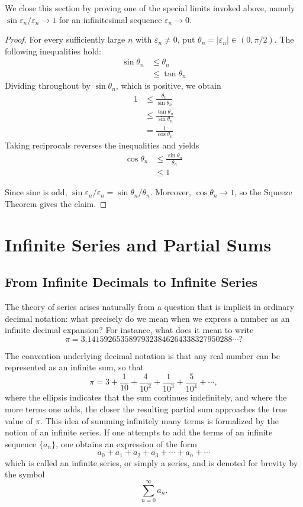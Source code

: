 We close this section by proving one of the special limits invoked above, namely $\sin \varepsilon_n / \varepsilon_n \to 1$
for an infinitesimal sequence $\varepsilon_n \to 0$.

\begin{proof}
For every sufficiently large $n$ with $\varepsilon_n\neq0$, put
$\theta_n=|\varepsilon_n|\in(0,\pi/2)$. The following inequalities hold:
\[
\begin{aligned}
\sin \theta_n &\leq \theta_n \\
&\leq \tan \theta_n
\end{aligned}
\]
Dividing throughout by $\sin \theta_n$, which is positive, we obtain
\[
\begin{aligned}
1 &\leq \frac{\theta_n}{\sin \theta_n} \\
&\leq \frac{\tan \theta_n}{\sin \theta_n} \\
&= \frac{1}{\cos \theta_n}
\end{aligned}
\]
Taking reciprocals reverses the inequalities and yields
\[
\begin{aligned}
\cos \theta_n &\leq \frac{\sin \theta_n}{\theta_n} \\
&\leq 1
\end{aligned}
\]

Since sine is odd,
$\sin\varepsilon_n/\varepsilon_n=\sin\theta_n/\theta_n$. Moreover,
$\cos\theta_n\to1$, so the Squeeze Theorem gives the claim.
\end{proof}

\section{Infinite Series and Partial Sums}

\subsection{From Infinite Decimals to Infinite Series}

The theory of series arises naturally from a question that is implicit in ordinary decimal notation: what
precisely do we mean when we express a number as an infinite decimal expansion? For instance, what does it mean
to write
\[
\pi = 3.14159265358979323846264338327950288 \cdots?
\]

The convention underlying decimal notation is that any real number can be represented as an infinite sum, so
that
\[
\pi = 3 + \frac{1}{10} + \frac{4}{10^2} + \frac{1}{10^3} + \frac{5}{10^4} + \cdots,
\] where the ellipsis indicates that the sum continues indefinitely, and where the more terms one adds, the closer
the resulting partial sum approaches the true value of $\pi$. This idea of summing infinitely many terms is
formalized by the notion of an infinite series. If one attempts to add the terms of an infinite sequence
$\{a_n\}$, one obtains an expression of the form
\[
a_0 + a_1 + a_2 + a_3 + \cdots + a_n + \cdots
\]
which is called an infinite series, or simply a series, and is denoted for brevity by the symbol
\[
\sum_{n=0}^{\infty} a_n.
\]

